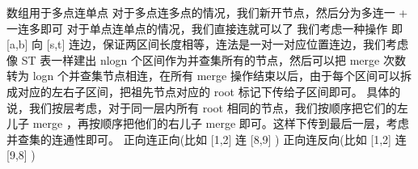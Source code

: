 {}\markdownRendererDollarSign{}数组用于多点连单点\markdownRendererParagraphSeparator
{}对于多点连多点的情况，我们新开节点，然后分为多连一\markdownRendererDollarSign{} + \markdownRendererDollarSign{}一连多即可\markdownRendererParagraphSeparator
{}对于单点连单点的情况，我们直接连就可以了\markdownRendererInterblockSeparator
{}\markdownRendererInterblockSeparator
{}
\markdownRendererSectionEnd \markdownRendererSectionBegin
{}\markdownRendererInterblockSeparator
{}\markdownRendererInterblockSeparator
{}
\markdownRendererSectionEnd \markdownRendererSectionBegin
{}\markdownRendererInterblockSeparator
{}我们考虑一种操作 即\markdownRendererDollarSign{} [a,b] \markdownRendererDollarSign{}向\markdownRendererDollarSign{} [s,t] \markdownRendererDollarSign{}连边，保证两区间长度相等，连法是一对一对应位置连边，我们考虑像\markdownRendererDollarSign{} ST \markdownRendererDollarSign{}表一样建出\markdownRendererDollarSign{} nlogn \markdownRendererDollarSign{}个区间作为并查集所有的节点，然后可以把\markdownRendererDollarSign{} merge \markdownRendererDollarSign{}次数转为\markdownRendererDollarSign{} logn \markdownRendererDollarSign{}个并查集节点相连，在所有\markdownRendererDollarSign{} merge \markdownRendererDollarSign{}操作结束以后，由于每个区间可以拆成对应的左右子区间，把祖先节点对应的\markdownRendererDollarSign{} root \markdownRendererDollarSign{}标记下传给子区间即可。\markdownRendererParagraphSeparator
{}具体的说，我们按层考虑，对于同一层内所有\markdownRendererDollarSign{} root \markdownRendererDollarSign{}相同的节点，我们按顺序把它们的左儿子\markdownRendererDollarSign{} merge \markdownRendererDollarSign{}，再按顺序把他们的右儿子\markdownRendererDollarSign{} merge \markdownRendererDollarSign{}即可。这样下传到最后一层，考虑并查集的连通性即可。\markdownRendererParagraphSeparator
{}正向连正向(比如\markdownRendererDollarSign{} [1,2] \markdownRendererDollarSign{}连\markdownRendererDollarSign{} [8,9] \markdownRendererDollarSign{})\markdownRendererInterblockSeparator
{}\markdownRendererInterblockSeparator
{}正向连反向(比如\markdownRendererDollarSign{} [1,2] \markdownRendererDollarSign{}连\markdownRendererDollarSign{} [9,8] \markdownRendererDollarSign{})\markdownRendererInterblockSeparator
{}\markdownRendererInterblockSeparator
